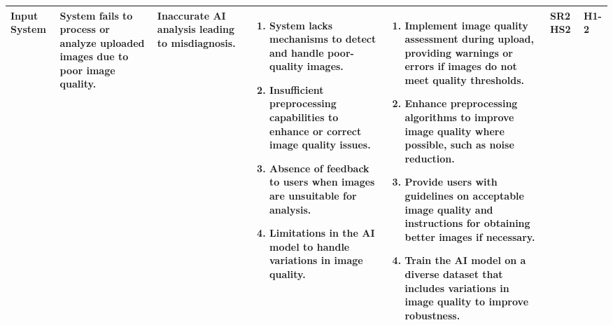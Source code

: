 \documentclass{article}
\begin{document}
\begin{landscape}
\begin{table}[ht]
{\begin{tabular}{|p{2.5cm}|p{2.5cm}|p{3cm}|p{5cm}|p{6cm}|p{1cm}|p{1cm}|}
    Input System
     & System fails to process or analyze uploaded images due to poor image quality.
     & Inaccurate AI analysis leading to misdiagnosis.
     &
     \begin{enumerate}[leftmargin=*, label={\alph*.}, itemsep=1pt]
         \item System lacks mechanisms to detect and handle poor-quality images.
         \item Insufficient preprocessing capabilities to enhance or correct image quality issues.
         \item Absence of feedback to users when images are unsuitable for analysis.
         \item Limitations in the AI model to handle variations in image quality.
     \end{enumerate}
     &
     \begin{enumerate}[leftmargin=*, label={\alph*.}, itemsep=1pt]
         \item Implement image quality assessment during upload, providing warnings or errors if images do not meet quality thresholds.
         \item Enhance preprocessing algorithms to improve image quality where possible, such as noise reduction.
         \item Provide users with guidelines on acceptable image quality and instructions for obtaining better images if necessary.
         \item Train the AI model on a diverse dataset that includes variations in image quality to improve robustness.
     \end{enumerate}
     & SR2 \newline HS2 & H1-2 \\ \hline

    \end{tabular}
    }
    \end{table}
\end{landscape}
\end{document}
